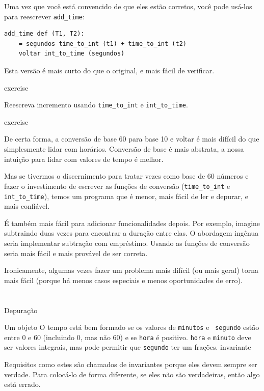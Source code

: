 \documentclass[10pt]{book}
\begin{document}
\begin{exercise}
\begin{v erbatim}
{Uma vez que você está convencido de que eles estão corretos, você pode usá-los para 
reescrever \verb "add_time":

\begin{verbatim}
add_time def (T1, T2):
    = segundos time_to_int (t1) + time_to_int (t2)
    voltar int_to_time (segundos)
\end{verbatim}
%
Esta versão é mais curto do que o original, e mais fácil de verificar.

\begin{} exercise

Reescreva {incremento \tt} usando \verb "time_to_int" e \verb "int_to_time".

\end{} exercise

De certa forma, a conversão de base 60 para base 10 e voltar é mais difícil
do que simplesmente lidar com horários. Conversão de base é mais abstrata, a nossa
intuição para lidar com valores de tempo é melhor.

Mas se tivermos o discernimento para tratar vezes como base de 60 números e fazer
o investimento de escrever as funções de conversão (\verb "time_to_int"
e \verb "int_to_time"), temos um programa que é menor, mais fácil de
ler e depurar, e mais confiável.

É também mais fácil para adicionar funcionalidades depois. Por exemplo, imagine
subtraindo duas vezes para encontrar a duração entre elas. O
abordagem ingênua seria implementar subtração com empréstimo.
Usando as funções de conversão seria mais fácil e mais provável de ser
correta.

Ironicamente, algumas vezes fazer um problema mais difícil (ou mais geral) torna
mais fácil (porque há menos casos especiais e menos oportunidades
de erro).


\section{} Depuração

Um objeto O tempo está bem formado se os valores de {\tt minutos} e {\tt
segundo} estão entre 0 e 60 (incluindo 0, mas não 60) e se 
{\tt hora} é positivo. {\tt hora} e {\tt minuto} deve ser
valores integrais, mas pode permitir que {\tt segundo} ter um
frações.
\index{} invariante

Requisitos como estes são chamados de invariantes {\bf} porque
eles devem sempre ser verdade. Para colocá-lo de forma diferente, se eles
não são verdadeiras, então algo está errado.

}
\end{v erbatim}
\end{exercise}
\end{document}
